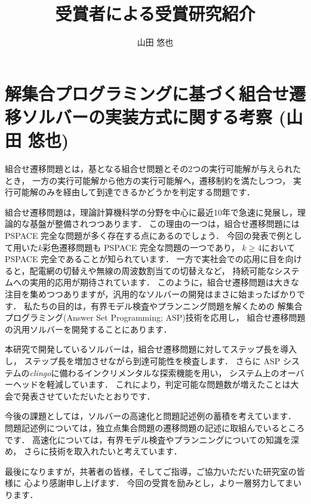 \documentclass[T, dvipdfmx]{compsoft}
\begin{document}
\title{受賞者による受賞研究紹介}

%
\author{山田 悠也}

\maketitle \thispagestyle {empty}

\section{解集合プログラミングに基づく組合せ遷移ソルバーの実装方式に関する考察 (山田 悠也)}

組合せ遷移問題とは，基となる組合せ問題とその2つの実行可能解が与えられたとき，
一方の実行可能解から他方の実行可能解へ，遷移制約を満たしつつ，
実行可能解のみを経由して到達できるかどうかを判定する問題です．

組合せ遷移問題は，理論計算機科学の分野を中心に最近10年で急速に発展し，理論的な基盤が整備されつつあります．
この理由の一つは，組合せ遷移問題には PSPACE 完全な問題が多く存在する点にあるのでしょう．
今回の発表で例として用いた$k$彩色遷移問題も PSPACE 完全な問題の一つであり，
$k \ge 4$において PSPACE 完全であることが知られています．
一方で実社会での応用に目を向けると，配電網の切替えや無線の周波数割当ての切替えなど，
持続可能なシステムへの実用的応用が期待されています．
このように，組合せ遷移問題は大きな注目を集めつつありますが，汎用的なソルバーの開発はまさに始まったばかりです．
私たちの目的は，有界モデル検査やプランニング問題を解くための
解集合プログラミング(Answer Set Programming; ASP)技術を応用し，
組合せ遷移問題の汎用ソルバーを開発することにあります．

本研究で開発しているソルバーは，組合せ遷移問題に対してステップ長を導入し，
ステップ長を増加させながら到達可能性を検査します．
さらに ASP システムの\textit{clingo}に備わるインクリメンタルな探索機能を用い，
システム上のオーバーヘッドを軽減しています．
これにより，判定可能な問題数が増えたことは大会で発表させていただいたとおりです．

今後の課題としては，ソルバーの高速化と問題記述例の蓄積を考えています．
問題記述例については，独立点集合問題の遷移問題の記述に取組んでいるところです．
高速化については，有界モデル検査やプランニングについての知識を深め，
さらに技術を取入れたいと考えています．

最後になりますが，共著者の皆様，そしてご指導，ご協力いただいた研究室の皆様に
心より感謝申し上げます．
今回の受賞を励みとし，より一層努力してまいります．
\end{document}
